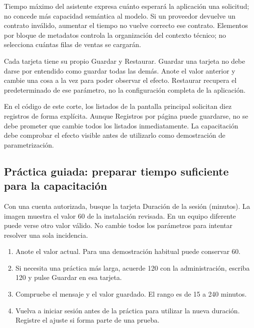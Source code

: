 Tiempo máximo del asistente expresa cuánto esperará la aplicación una solicitud; no concede más capacidad semántica al modelo. Si un proveedor devuelve un contrato inválido, aumentar el tiempo no vuelve correcto ese contrato. Elementos por bloque de metadatos controla la organización del contexto técnico; no selecciona cuántas filas de ventas se cargarán.

Cada tarjeta tiene su propio Guardar y Restaurar. Guardar una tarjeta no debe darse por entendido como guardar todas las demás. Anote el valor anterior y cambie una cosa a la vez para poder observar el efecto. Restaurar recupera el predeterminado de ese parámetro, no la configuración completa de la aplicación.

En el código de este corte, los listados de la pantalla principal solicitan diez registros de forma explícita. Aunque Registros por página puede guardarse, no se debe prometer que cambie todos los listados inmediatamente. La capacitación debe comprobar el efecto visible antes de utilizarlo como demostración de parametrización.

\subsection{Práctica guiada: preparar tiempo suficiente para la capacitación}
Con una cuenta autorizada, busque la tarjeta Duración de la sesión (minutos). La imagen muestra el valor 60 de la instalación revisada. En un equipo diferente puede verse otro valor válido. No cambie todos los parámetros para intentar resolver una sola incidencia.

\begin{enumerate}
\item Anote el valor actual. Para una demostración habitual puede conservar 60.
\item Si necesita una práctica más larga, acuerde 120 con la administración, escriba 120 y pulse Guardar en esa tarjeta.
\item Compruebe el mensaje y el valor guardado. El rango es de 15 a 240 minutos.
\item Vuelva a iniciar sesión antes de la práctica para utilizar la nueva duración. Registre el ajuste si forma parte de una prueba.
\end{enumerate}


